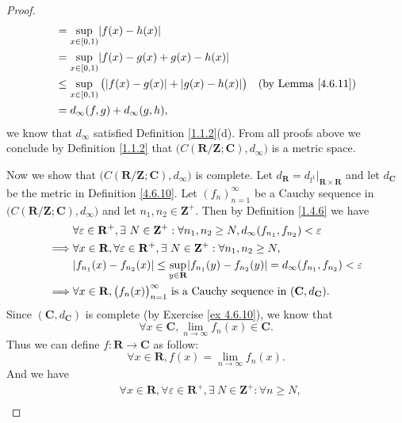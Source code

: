 \begin{proof}
\begin{align*}
         & = \sup_{x \in [0, 1)} \abs*{f(x) - h(x)}                                                                     \\
         & = \sup_{x \in [0, 1)} \abs*{f(x) - g(x) + g(x) - h(x)}                                                       \\
         & \leq \sup_{x \in [0, 1)} \big(\abs*{f(x) - g(x)} + \abs*{g(x) - h(x)}\big)  & \text{(by Lemma \ref{4.6.11})} \\
         & = d_\infty(f, g) + d_\infty(g, h),
    \end{align*}
    we know that \(d_\infty\) satisfied Definition \ref{1.1.2}(d).
    From all proofs above we conclude by Definition \ref{1.1.2} that \(\big(C(\mathbf{R} / \mathbf{Z} ; \mathbf{C}), d_\infty\big)\) is a metric space.

    Now we show that \(\big(C(\mathbf{R} / \mathbf{Z} ; \mathbf{C}), d_\infty\big)\) is complete.
    Let \(d_{\mathbf{R}} = d_{l^1}|_{\mathbf{R} \times \mathbf{R}}\) and let \(d_{\mathbf{C}}\) be the metric in Definition \ref{4.6.10}.
    Let \((f_n)_{n = 1}^\infty\) be a Cauchy sequence in \(\big(C(\mathbf{R} / \mathbf{Z} ; \mathbf{C}), d_\infty\big)\) and let \(n_1, n_2 \in \mathbf{Z}^+\).
    Then by Definition \ref{1.4.6} we have
    \begin{align*}
                 & \forall \varepsilon \in \mathbf{R}^+, \exists\ N \in \mathbf{Z}^+ : \forall n_1, n_2 \geq N, d_\infty(f_{n_1}, f_{n_2}) < \varepsilon \\
        \implies & \forall x \in \mathbf{R}, \forall \varepsilon \in \mathbf{R}^+, \exists\ N \in \mathbf{Z}^+ : \forall n_1, n_2 \geq N,                \\
                 & \abs*{f_{n_1}(x) - f_{n_2}(x)} \leq \sup_{y \in \mathbf{R}} \abs*{f_{n_1}(y) - f_{n_2}(y)} = d_\infty(f_{n_1}, f_{n_2}) < \varepsilon \\
        \implies & \forall x \in \mathbf{R}, \big(f_n(x)\big)_{n = 1}^\infty \text{ is a Cauchy sequence in } (\mathbf{C}, d_{\mathbf{C}}).
    \end{align*}
    Since \((\mathbf{C}, d_{\mathbf{C}})\) is complete (by Exercise \ref{ex 4.6.10}), we know that
    \[
        \forall x \in \mathbf{C}, \lim_{n \to \infty} f_n(x) \in \mathbf{C}.
    \]
    Thus we can define \(f : \mathbf{R} \to \mathbf{C}\) as follow:
    \[
        \forall x \in \mathbf{R}, f(x) = \lim_{n \to \infty} f_n(x).
    \]
    And we have
    \begin{align*}
                 & \forall x \in \mathbf{R}, \forall \varepsilon \in \mathbf{R}^+, \exists\ N \in \mathbf{Z}^+ : \forall n \geq N, \\

\end{align*}
\end{proof}
